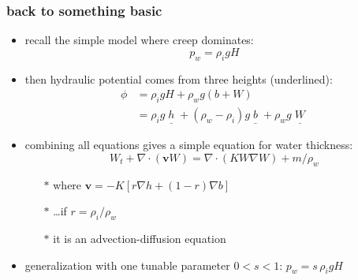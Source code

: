 \documentclass[hide notes,intlimits]{beamer}
\begin{document}
\begin{frame}
  \frametitle{back to something basic}

  \begin{itemize}
    \item recall the simple model where creep dominates:
    		$$p_w = \rho_i g H$$
    \item then hydraulic potential comes from three heights (underlined):
    \begin{align*}
      \phi &= \rho_i g H + \rho_w g (b+W) \\
           &= \rho_i g \underline{\phantom{|}h\phantom{|}} + (\rho_w - \rho_i) g \underline{\phantom{|}b\phantom{|}} + \rho_w g \underline{\phantom{|}W\phantom{|}}
    \end{align*}
    \item<2-3> combining all equations gives a simple equation for water thickness:
       $$\boxed{W_t + \nabla\cdot\left(\mathbf{v} W\right) = \nabla \cdot(K W \nabla W) + m / \rho_w}$$
      \begin{itemize}
      \vspace{-6mm}
      \item[$\ast$] where $\mathbf{v} = - K \left[r \nabla h + (1-r) \nabla b\right]$
      \item[$\ast$] \dots if $r = \rho_i/\rho_w$
      \item[$\ast$] it is an advection-diffusion equation
      \end{itemize}
    \item<3> \scriptsize generalization with one tunable parameter $0<s<1$: \quad $p_w = s\, \rho_i g H$
  \end{itemize}
\end{frame}
\end{document}
